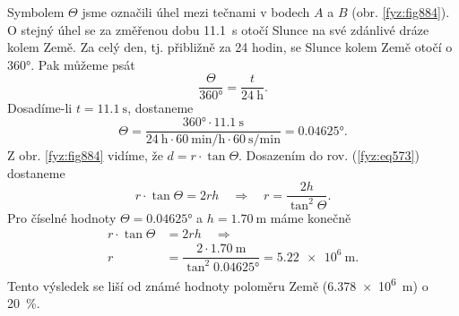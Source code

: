 \begin{mdframed}[style=mdexam]
\begin{example}
    {\centering
    \captionsetup{type=figure}
    \par}
    \vspace{1em}
    Symbolem \(\varTheta\) jsme označili úhel mezi tečnami v bodech \(A\) a \(B\) (obr.
    \ref{fyz:fig884}). O stejný úhel se za změřenou dobu \SI{11.1}{\s} otočí Slunce na své zdánlivé
    dráze kolem Země. Za celý den, tj. přibližně za \num{24} hodin, se Slunce kolem Země otočí o
    \ang{360}. Pak můžeme psát
    \begin{equation*}
      \dfrac{\varTheta}{\ang{360}} = \dfrac{t}{\SI{24}{\hour}}.
    \end{equation*}
    Dosadíme-li \(t = \SI{11.1}{\s}\), dostaneme
    \begin{equation*}
      \varTheta = \dfrac{\ang{360}\cdot\SI{11.1}{\s}}
                        {\SI{24}{\hour}\cdot\SI{60}{\minute\per\hour}\cdot\SI{60}{\s\per\minute}}
                =\ang{0.04625}.
    \end{equation*}
    Z obr. \ref{fyz:fig884} vidíme, že \(d = r\cdot\tan{\varTheta}\). Dosazením do rov.
    (\ref{fyz:eq573}) dostaneme
    \begin{equation}\label{fyz:eq574}
      r\cdot\tan{\varTheta} = 2rh\quad\Rightarrow\quad 
      r = \dfrac{2h}{\tan^2{\varTheta}}.
    \end{equation}
    Pro číselné hodnoty \(\varTheta = \ang{0.04625}\) a \(h = \SI{1.70}{\m}\) máme konečně
    \begin{align*}
      r\cdot\tan{\varTheta} &= 2rh\quad\Rightarrow   \\
                          r &= \dfrac{2\cdot\SI{1.70}{\m}}{\tan^2{\ang{0.04625}}}=\SI{5.22e6}{\m}.
    \end{align*}
    Tento výsledek se liší od známé hodnoty poloměru Země (\SI{6.378e6}{\m}) o \SI{20}{\percent}.
  \end{example}
\end{mdframed}